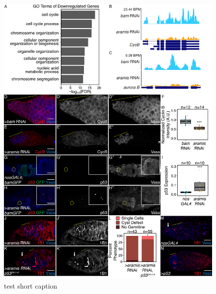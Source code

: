 \documentclass[12pt,oneside]{reedthesis}
\begin{document}
\begin{figure}

{\centering \includegraphics[width=6.5 in,height=8.9375 in]{./figure/Ribosome Biogenesis/Ribosome Biogenesis 3} 

}

\caption[test short caption]{test short caption}\label{fig:unnamed-chunk-10}
\end{figure}
\end{document}
